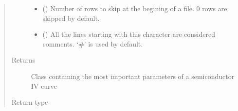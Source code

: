 \documentclass[letterpaper,10pt,english,openany, oneside]{sphinxmanual}
\begin{document}
\begin{fulllineitems}
\begin{quote}
\begin{description}
\begin{itemize}
\item {} 
 () \textendash{} Number of rows to skip at the begining of a file. 0 rows are skipped by default.

\item {} 
 () \textendash{} All the lines starting with this character are considered comments.
‘\#’ is used by default.

\end{itemize}

\item[{Returns}] \leavevmode
Class containing the most important parameters of a semiconductor IV curve

\item[{Return type}] \leavevmode
{\hyperref[\detokenize{index:fompy.fds.FompyDataset}]{}}

\end{description}\end{quote}

\end{fulllineitems}

\end{document}
